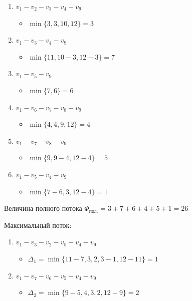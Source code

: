\documentclass{article}
\begin{document}
\begin{enumerate} 
	\setlength{\itemindent}{3mm}
	\item $v_1 - v_2 - v_3 - v_4 - v_9$
	\begin{itemize}
		\setlength{\itemindent}{3mm}
		\item $\min\{3, 3, 10, 12\} = 3$
	\end{itemize}
	\item $v_1 - v_3 - v_4 - v_9$
	\begin{itemize}
		\setlength{\itemindent}{3mm}
		\item $\min\{11, 10-3, 12-3\} = 7$
	\end{itemize}
	\item $v_1 - v_5 - v_9$
	\begin{itemize}
		\setlength{\itemindent}{3mm}
		\item $\min\{7, 6\} = 6$
	\end{itemize}
	\item $v_1 - v_6 - v_7 - v_8 - v_9$
	\begin{itemize}
		\setlength{\itemindent}{3mm}
		\item $\min\{4, 4, 9, 12\} = 4$
	\end{itemize}
	\item $v_1 - v_7 - v_8 - v_9$
	\begin{itemize}
		\setlength{\itemindent}{3mm}
		\item $\min\{9, 9-4, 12-4\} = 5$
	\end{itemize}
	\item $v_1 - v_5 - v_4 - v_9$
	\begin{itemize}
		\setlength{\itemindent}{3mm}
		\item $\min\{7-6, 3, 12-4\} = 1$
	\end{itemize}
\end{enumerate}
\par
Величина полного потока $\Phi_{\text{пол.}} = 3 + 7 + 6 + 4 + 5 + 1 = 26$
\par
Максимальный поток:
\par
\begin{enumerate} 
	\setlength{\itemindent}{3mm}
	\item $v_1 - v_3 - v_2 - v_5 - v_4 - v_9$
	\begin{itemize}
		\setlength{\itemindent}{3mm}
		\item $\Delta_1 = \min\{11-7, 3, 2, 3-1, 12-11\} = 1$
	\end{itemize}
	\newpage
	\item $v_1 - v_7 - v_6 - v_5 - v_4 - v_9$
	\begin{itemize}
		\setlength{\itemindent}{3mm}
		\item $\Delta_2 = \min\{9-5, 4, 3, 2, 12-9\} = 2$
	\end{itemize}
\end{enumerate}
\end{document}

